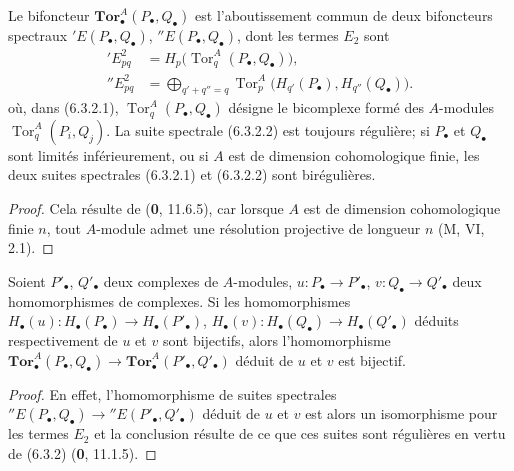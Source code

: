 \begin{proposition}[6.3.2]
Le bifoncteur $\mathbf{Tor}_\bullet^A(P_\bullet,Q_\bullet)$ est
l'aboutissement commun de deux bifoncteurs spectraux
$'E(P_\bullet,Q_\bullet)$, $''E(P_\bullet,Q_\bullet)$, dont les termes $E_2$
sont
\begin{align}
  'E^2_{pq}
    &=H_p\bigl(\operatorname{Tor}_q^A(P_\bullet,Q_\bullet)\bigr),
    \tag{6.3.2.1}\label{III.6.3.2.1.fr}\\
  ''E^2_{pq}
    &=\bigoplus_{q'+q''=q}
      \operatorname{Tor}_p^A\bigl(H_{q'}(P_\bullet),H_{q''}(Q_\bullet)\bigr).
    \tag{6.3.2.2}\label{III.6.3.2.2.fr}
\end{align}
où, dans \textup{(6.3.2.1)}, $\operatorname{Tor}_q^A(P_\bullet,Q_\bullet)$ désigne le
bicomplexe formé des $A$-modules $\operatorname{Tor}_q^A(P_i,Q_j)$. La suite
spectrale \textup{(6.3.2.2)} est toujours régulière; si $P_\bullet$ et $Q_\bullet$
sont limités inférieurement, ou si $A$ est de dimension cohomologique finie,
les deux suites spectrales \textup{(6.3.2.1)} et \textup{(6.3.2.2)} sont birégulières.
\end{proposition}

\begin{proof}
Cela résulte de (\textbf{0}, 11.6.5), car lorsque $A$ est de dimension cohomologique
finie $n$, tout $A$-module admet une résolution projective de longueur $n$
(M, VI, 2.1).
\end{proof}

\begin{corollary}[6.3.3]
Soient $P'_\bullet$, $Q'_\bullet$ deux complexes de $A$-modules,
$u:P_\bullet\to P'_\bullet$, $v:Q_\bullet\to Q'_\bullet$ deux homomorphismes
de complexes. Si les homomorphismes
$H_\bullet(u):H_\bullet(P_\bullet)\to H_\bullet(P'_\bullet)$,
$H_\bullet(v):H_\bullet(Q_\bullet)\to H_\bullet(Q'_\bullet)$ déduits
respectivement de $u$ et $v$ sont bijectifs, alors l'homomorphisme
$\mathbf{Tor}_\bullet^A(P_\bullet,Q_\bullet)\to
\mathbf{Tor}_\bullet^A(P'_\bullet,Q'_\bullet)$ déduit de $u$ et $v$ est
bijectif.
\end{corollary}

\begin{proof}
En effet, l'homomorphisme de suites spectrales
$''E(P_\bullet,Q_\bullet)\to''E(P'_\bullet,Q'_\bullet)$ déduit de $u$ et $v$
est alors un isomorphisme pour les termes $E_2$ et la conclusion résulte de
ce que ces suites sont régulières en vertu de (6.3.2) (\textbf{0}, 11.1.5).
\end{proof}

